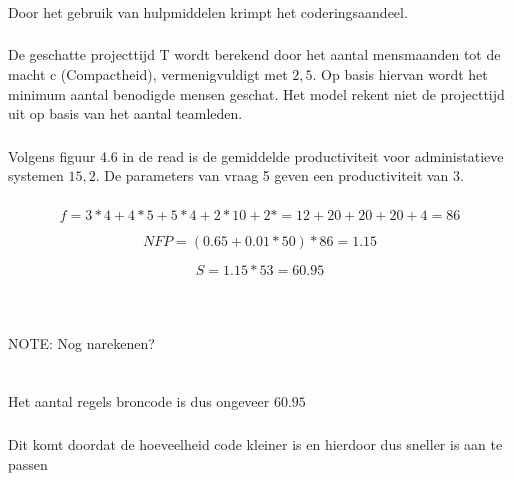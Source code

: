 \documentclass[a4paper,titlepage]{artikel1}
\begin{document}
\subsubsection[Opdracht 3]{}
Door het gebruik van hulpmiddelen krimpt het coderingsaandeel.

\subsubsection[Opdracht 4]{}
De geschatte projecttijd T wordt berekend door het aantal mensmaanden tot de macht c (Compactheid), vermenigvuldigt met $2,5$. Op basis hiervan wordt het minimum aantal benodigde mensen geschat. Het model rekent niet de projecttijd uit op basis van het aantal teamleden.

\subsubsection[Opdracht 5]{}
Volgens figuur 4.6 in de read is de gemiddelde productiviteit voor administatieve systemen $15,2$. De parameters van vraag 5 geven een productiviteit van $3$.

\subsubsection[Opdracht 6]{}
\begin{displaymath}
f=3*4+4*5+5*4+2*10+2*=12+20+20+20+4=86
\end{displaymath}

\begin{displaymath}
NFP=(0.65+0.01*50)*86=1.15
\end{displaymath}

\begin{displaymath}
S=1.15*53=60.95
\end{displaymath}
\\\\\\NOTE: Nog narekenen?\\\\\\
Het aantal regels broncode is dus ongeveer $60.95$
\subsubsection[Opdracht 7]{}
Dit komt doordat de hoeveelheid code kleiner is en hierdoor dus sneller is aan te passen
\end{document}
